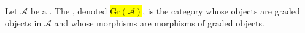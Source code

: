\begin{definition} \label{definition:category_of_graded_objects_in_a_category}
    Let $\mathcal{A}$ be a .
    The , denoted \hl{$\text{Gr}(\mathcal{A})$}, is the category whose objects are graded objects in $\mathcal{A}$ and whose morphisms are morphisms of graded objects.
\end{definition}